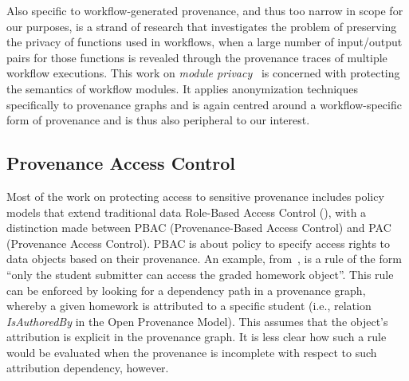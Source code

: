 Also specific to workflow-generated provenance, and thus too narrow in scope for our purposes, is a  strand of research that investigates the problem of preserving the privacy of functions used in workflows, when a large number of input/output pairs for those functions is revealed through the provenance traces of multiple workflow executions. This work on  \textit{module privacy}~\citep{Davidson:2011:PP:1938551.1938554,Davidson2010a,Davidson:2011:PVM:1989284.1989305} is concerned with protecting the semantics of workflow modules. 
It applies anonymization techniques specifically to provenance graphs and is again centred around a workflow-specific form of provenance and  is thus also peripheral to our interest.

%



\subsection{Provenance Access Control}

Most of the work on protecting access to sensitive provenance includes policy models that extend traditional data Role-Based Access Control (), with a distinction made between PBAC (Provenance-Based Access Control) and PAC (Provenance Access Control).
%
PBAC is about policy to specify access rights to data objects based on their provenance.
%
An example, from~\citep{nguyen2012dependency}, is a rule of the form ``only the student submitter can access the graded homework object''. 
%
This rule can be enforced by looking for a dependency path in a provenance graph, whereby a given homework is attributed to a specific student (i.e., relation \textit{IsAuthoredBy} in the Open Provenance Model). This assumes that the object's attribution is explicit in the provenance graph. It is less clear how such a rule would be evaluated when the provenance is incomplete with respect to such attribution dependency, however.

